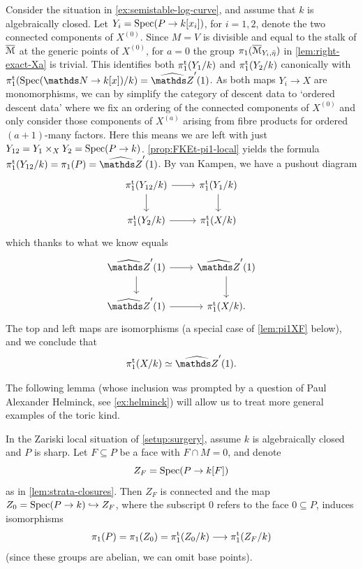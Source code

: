\begin{ex} \label{ex:semistable-log-curve-2}
    Consider the situation in \cref{ex:semistable-log-curve}, and assume that $k$ is algebraically closed. Let $Y_i = \operatorname{Spec}(P \to k[x_i])$, for $i = 1,2$, denote the two connected components of $X^{(0)}$.
    Since $M=V$ is divisible and equal to the stalk of $\overline{{\mathcal M}}$ at the generic points of $X^{(0)}$, for $a=0$ the group $\pi_1(\overline{{\mathcal M}}_{Y_i,\bar\eta})$ in \cref{lem:right-exact-Xa} is trivial.  This identifies both $\pi_1^{\mathrm{t}}(Y_1/k)$ and $\pi_1^{\mathrm{t}}(Y_2/k)$ canonically with $\pitame(\Spec(\bN \to k[x])/k) = \widehat{\mathbb{Z}}'(1)$. As both maps $Y_i \to X$ are monomorphisms, we can by \cite[Proposition~4.3]{Stix2006:vanKampen} simplify the category of descent data to `ordered descent data' where we fix an ordering of the connected components of $X^{(0)}$ and only consider those components of $X^{(a)}$ arising from fibre products for ordered $(a+1)$-many factors. Here this means we are left with just $Y_{12} = Y_1 \times_X Y_2 = \operatorname{Spec}(P \to k)$. \cref{prop:FKEt-pi1-local} yields the formula $\pitame(Y_{12}/k) = \pi_1(P) = \widehat{\mathbb{Z}}'(1)$.   
    By van Kampen, we have a pushout diagram
    \[
        \begin{tikzcd}
            \pitame(Y_{12}/k) \ar[r] \ar[d] & \pitame(Y_1/k) \ar[d] \\
            \pitame(Y_2/k) \ar[r] & \pitame(X/k)
        \end{tikzcd}
    \]
    which thanks to what we know equals
    \[
        \begin{tikzcd}
            \widehat{\mathbb{Z}}'(1) \ar[r] \ar[d] & \widehat{\mathbb{Z}}'(1) \ar[d] \\
            \widehat{\mathbb{Z}}'(1) \ar[r] & \pitame(X/k).
        \end{tikzcd}
    \]
    The top and left maps are isomorphisms (a special case of \cref{lem:pi1XF} below), and we conclude that 
    \[
        \pitame(X/k) \simeq \widehat{\mathbb{Z}}'(1).  
    \]
\end{ex}

The following lemma (whose inclusion was prompted by a question of Paul Alexander Helminck, see \cref{ex:helminck}) will allow us to treat more general examples of the toric kind. 

\begin{lem} \label{lem:pi1XF}  
     In the Zariski local situation of \cref{setup:surgery}, assume $k$ is algebraically closed and $P$ is sharp. Let $F \subseteq P$ be a face with $F \cap M = 0$, and denote 
     \[
     Z_F = \operatorname{Spec}(P\to k[F])
     \]
     as in \cref{lem:strata-closures}. Then $Z_F$ is connected and the map $Z_0 = \operatorname{Spec}(P\to k) \hookrightarrow Z_F$, where the subscript $0$ refers to the face $0\subseteq P$, induces isomorphisms
     \[
        \pi_1(P) = \pi_1(Z_0) = \pi_1^{\mathrm{t}}(Z_0/k)\longrightarrow \pi_1^{\mathrm{t}}(Z_F/k)
    \]
    (since these groups are abelian, we can omit base points). 
\end{lem}

